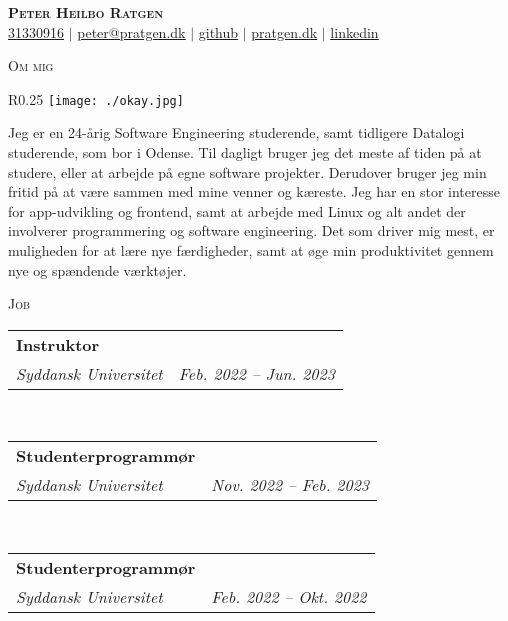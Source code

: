 \documentclass[11pt]{article}
\makeatletter
\newcommand{\resumeSubheading}[4]{
  \noindent\begin{tabular*}{0.98\textwidth}[t]{l@{\extracolsep{\fill}}r}
    \noindent \textbf{#3} & \textit{\small #2} \\ \vspace{-3pt} 
    \noindent \textit{\small #1} & \textit{\small #4} 
  \end{tabular*}\vspace{7pt}
}
\makeatother
\begin{document}
\begin{center}
  \textbf{\huge{\scshape{Peter Heilbo Ratgen}}}\\ 
  \vspace{0.2cm}
  \small \href{tel:+4531330916}{31330916} $|$
  \href{mailto:peter@pratgen.dk}{\underline{peter@pratgen.dk}} $|$
  \href{https://github.com/ratgen }{\underline{github}} $|$
  \href{https://pratgen.dk}{\underline{pratgen.dk}} $|$
  \href{https://www.linkedin.com/in/peter-ratgen-a1236529/}{\underline{linkedin}}
\end{center}

\noindent\large{\scshape{Om mig}} \newline
\noindent{\rule[0.3cm]{\textwidth}{0.4pt}}

\begin{wrapfigure}{R}{0.25\textwidth}
  \vspace{-0.7cm}
  \texttt{[image: ./okay.jpg]}
\end{wrapfigure}
\normalsize Jeg er en 24-årig Software Engineering studerende, samt tidligere
Datalogi studerende, som bor i Odense. Til dagligt bruger jeg det meste af tiden
på at studere, eller at arbejde på egne software projekter. Derudover bruger jeg
min fritid på at være sammen med mine venner og kæreste. Jeg har en stor
interesse for app-udvikling og frontend, samt at arbejde med Linux og alt andet
der involverer programmering og software engineering. Det som driver mig mest,
er muligheden for at lære nye færdigheder, samt at øge min produktivitet gennem
nye og spændende værktøjer.

\vspace{0.3cm}
\noindent\large{\scshape{Job}} \newline
\noindent{\rule[0.3cm]{\textwidth}{0.4pt}}

\resumeSubheading{Syddansk Universitet}{}{Instruktor}{Feb. 2022 -- Jun. 2023}\\

\vspace{0.3cm}
\resumeSubheading{Syddansk Universitet}{}{Studenterprogrammør}{Nov. 2022 -- Feb. 2023}\\

\vspace{0.3cm}
\resumeSubheading{Syddansk Universitet}{}{Studenterprogrammør}{Feb. 2022 -- Okt. 2022}\\
\end{document}
